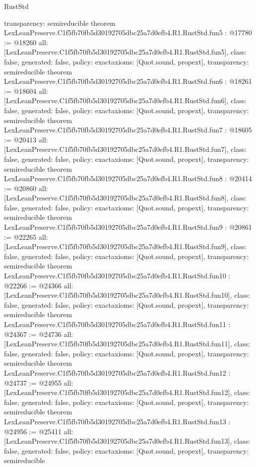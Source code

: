 \begin{lexlean}{RustStd}
\begin{coremodule}
{  transparency: semireducible
}
theorem LexLeanPreserve.C1f5fb70fb5d30192705dbc25a7d0efb4.R1.RustStd.fun5 : @17780 := @18260 {
  all: [LexLeanPreserve.C1f5fb70fb5d30192705dbc25a7d0efb4.R1.RustStd.fun5],
  class: false,
  generated: false,
  policy: exact{axioms: [Quot.sound, propext]},
  transparency: semireducible
}
theorem LexLeanPreserve.C1f5fb70fb5d30192705dbc25a7d0efb4.R1.RustStd.fun6 : @18261 := @18604 {
  all: [LexLeanPreserve.C1f5fb70fb5d30192705dbc25a7d0efb4.R1.RustStd.fun6],
  class: false,
  generated: false,
  policy: exact{axioms: [Quot.sound, propext]},
  transparency: semireducible
}
theorem LexLeanPreserve.C1f5fb70fb5d30192705dbc25a7d0efb4.R1.RustStd.fun7 : @18605 := @20413 {
  all: [LexLeanPreserve.C1f5fb70fb5d30192705dbc25a7d0efb4.R1.RustStd.fun7],
  class: false,
  generated: false,
  policy: exact{axioms: [Quot.sound, propext]},
  transparency: semireducible
}
theorem LexLeanPreserve.C1f5fb70fb5d30192705dbc25a7d0efb4.R1.RustStd.fun8 : @20414 := @20860 {
  all: [LexLeanPreserve.C1f5fb70fb5d30192705dbc25a7d0efb4.R1.RustStd.fun8],
  class: false,
  generated: false,
  policy: exact{axioms: [Quot.sound, propext]},
  transparency: semireducible
}
theorem LexLeanPreserve.C1f5fb70fb5d30192705dbc25a7d0efb4.R1.RustStd.fun9 : @20861 := @22265 {
  all: [LexLeanPreserve.C1f5fb70fb5d30192705dbc25a7d0efb4.R1.RustStd.fun9],
  class: false,
  generated: false,
  policy: exact{axioms: [Quot.sound, propext]},
  transparency: semireducible
}
theorem LexLeanPreserve.C1f5fb70fb5d30192705dbc25a7d0efb4.R1.RustStd.fun10 : @22266 := @24366 {
  all: [LexLeanPreserve.C1f5fb70fb5d30192705dbc25a7d0efb4.R1.RustStd.fun10],
  class: false,
  generated: false,
  policy: exact{axioms: [Quot.sound, propext]},
  transparency: semireducible
}
theorem LexLeanPreserve.C1f5fb70fb5d30192705dbc25a7d0efb4.R1.RustStd.fun11 : @24367 := @24736 {
  all: [LexLeanPreserve.C1f5fb70fb5d30192705dbc25a7d0efb4.R1.RustStd.fun11],
  class: false,
  generated: false,
  policy: exact{axioms: [Quot.sound, propext]},
  transparency: semireducible
}
theorem LexLeanPreserve.C1f5fb70fb5d30192705dbc25a7d0efb4.R1.RustStd.fun12 : @24737 := @24955 {
  all: [LexLeanPreserve.C1f5fb70fb5d30192705dbc25a7d0efb4.R1.RustStd.fun12],
  class: false,
  generated: false,
  policy: exact{axioms: [Quot.sound, propext]},
  transparency: semireducible
}
theorem LexLeanPreserve.C1f5fb70fb5d30192705dbc25a7d0efb4.R1.RustStd.fun13 : @24956 := @25411 {
  all: [LexLeanPreserve.C1f5fb70fb5d30192705dbc25a7d0efb4.R1.RustStd.fun13],
  class: false,
  generated: false,
  policy: exact{axioms: [Quot.sound, propext]},
  transparency: semireducible
}
\end{coremodule}
\end{lexlean}
